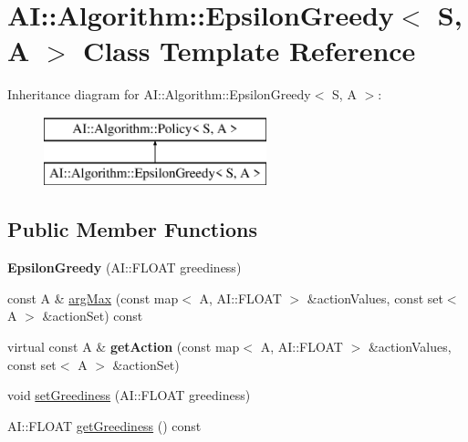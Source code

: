 \hypertarget{classAI_1_1Algorithm_1_1EpsilonGreedy}{\section{A\-I\-:\-:Algorithm\-:\-:Epsilon\-Greedy$<$ S, A $>$ Class Template Reference}
\label{classAI_1_1Algorithm_1_1EpsilonGreedy}
}
Inheritance diagram for A\-I\-:\-:Algorithm\-:\-:Epsilon\-Greedy$<$ S, A $>$\-:\begin{figure}[H]
\begin{center}
\leavevmode
\includegraphics[height=2.000000cm]{classAI_1_1Algorithm_1_1EpsilonGreedy}
\end{center}
\end{figure}
\subsection*{Public Member Functions}
\begin{DoxyCompactItemize}
\item 
\hypertarget{classAI_1_1Algorithm_1_1EpsilonGreedy_a551be3b4d7e0b0999af0ab2048bed044}{{\bfseries Epsilon\-Greedy} (A\-I\-::\-F\-L\-O\-A\-T greediness)}\label{classAI_1_1Algorithm_1_1EpsilonGreedy_a551be3b4d7e0b0999af0ab2048bed044}

\item 
const A \& \hyperlink{classAI_1_1Algorithm_1_1EpsilonGreedy_ad0f2a6db0df11619cb100f1d10ea48d4}{arg\-Max} (const map$<$ A, A\-I\-::\-F\-L\-O\-A\-T $>$ \&action\-Values, const set$<$ A $>$ \&action\-Set) const 
\item 
\hypertarget{classAI_1_1Algorithm_1_1EpsilonGreedy_ad2d0006a6f54d721c1cf6563756e0c4b}{virtual const A \& {\bfseries get\-Action} (const map$<$ A, A\-I\-::\-F\-L\-O\-A\-T $>$ \&action\-Values, const set$<$ A $>$ \&action\-Set)}\label{classAI_1_1Algorithm_1_1EpsilonGreedy_ad2d0006a6f54d721c1cf6563756e0c4b}

\item 
void \hyperlink{classAI_1_1Algorithm_1_1EpsilonGreedy_a1d145bbc6b9149782ca43c42e0fa2736}{set\-Greediness} (A\-I\-::\-F\-L\-O\-A\-T greediness)
\item 
A\-I\-::\-F\-L\-O\-A\-T \hyperlink{classAI_1_1Algorithm_1_1EpsilonGreedy_aa236aeabacddb30531a6fd5f93d9acd1}{get\-Greediness} () const 
\end{DoxyCompactItemize}
